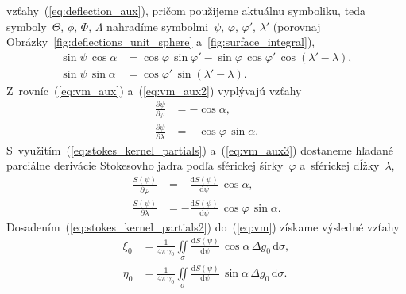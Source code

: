 \documentclass[a4paper, 12pt]{book}
\newcommand{\diff}{\mathrm d}
\begin{document}
vzťahy~(\ref{eq:deflection_aux}), pričom použijeme aktuálnu symboliku, teda 
symboly~$\Theta$, $\phi$, $\Phi$, $\Lambda$ nahradíme symbolmi~$\psi$, 
$\varphi$, $\varphi'$, $\lambda'$ (porovnaj 
Obrázky~\ref{fig:deflections_unit_sphere} a~\ref{fig:surface_integral}),
%
\begin{equation}
\label{eq:vm_aux2}
\begin{split}
\sin\psi \, \cos\alpha &= \cos\varphi \, \sin\varphi' - \sin\varphi \, 
\cos\varphi' \, \cos(\lambda' - \lambda){,}\\
\sin\psi \, \sin\alpha &= \cos\varphi' \, \sin(\lambda' - \lambda){.}
\end{split}
\end{equation}
%
Z~rovníc~(\ref{eq:vm_aux}) a~(\ref{eq:vm_aux2}) vyplývajú vzťahy
%
\begin{equation}
\label{eq:vm_aux3}
\begin{split}
\frac{\partial\psi}{\partial\varphi} &= -\cos\alpha{,}\\
%
\frac{\partial\psi}{\partial\lambda} &= -\cos\varphi \, \sin\alpha{.}
\end{split}
\end{equation}
%
S~využitím~(\ref{eq:stokes_kernel_partials}) a~(\ref{eq:vm_aux3}) dostaneme 
hľadané parciálne derivácie Stokesovho jadra podľa sférickej šírky~$\varphi$ 
a~sférickej dĺžky~$\lambda$,
%
\begin{equation}
\label{eq:stokes_kernel_partials2}
\begin{split}
\frac{S(\psi)}{\partial\varphi} &= -\frac{\diff S(\psi)}{\diff \psi} \, 
\cos\alpha{,}\\
%
\frac{S(\psi)}{\partial\lambda} &= -\frac{\diff S(\psi)}{\diff \psi} \, 
\cos\varphi \, \sin\alpha{.}
\end{split}
\end{equation}
%
Dosadením~(\ref{eq:stokes_kernel_partials2}) do~(\ref{eq:vm}) získame výsledné 
vzťahy
%
\begin{equation}
\label{eq:vm2}
\begin{split}
\xi_0 &= \frac{1}{4\pi\,\gamma_0} \iint\limits_\sigma \frac{\diff 
S(\psi)}{\diff \psi} \, \cos\alpha \, \Delta g_0 \, \diff\sigma{,}\\
\eta_0 &= \frac{1}{4\pi\,\gamma_0} \iint\limits_\sigma \frac{\diff 
S(\psi)}{\diff \psi} \, \sin\alpha \, \Delta g_0 \, \diff\sigma{.}
\end{split}
\end{equation}
\end{document}
